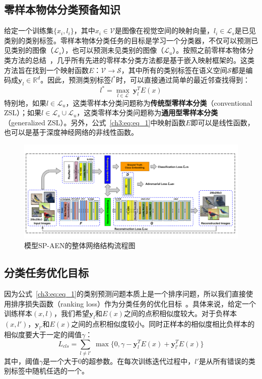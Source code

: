 \subsection{零样本物体分类预备知识}
给定一个训练集$\{x_i, l_i\}$，其中$x_i\in\mathcal{V}$是图像在视觉空间的映射向量，$l_i\in \mathcal{L}_s$是已见类别的类别标签。零样本物体分类任务的目标是学习一个分类器，不仅可以预测已见类别的图像（$\mathcal{L}_s$），也可以预测未见类别的图像（$\mathcal{L}_u$）。按照之前零样本物体分类方法的总结~\cite{xian2017zero,lei2015predicting}，几乎所有先进的零样本分类方法都是基于嵌入映射框架的。这类方法旨在找到一个映射函数$E$：$\mathcal{V}\rightarrow \mathcal{S}$，其中所有的类别标签在语义空间$\mathcal{S}$都是编码成$\bm{y}_l\in\mathbb{R}^d$。因此，预测类别标签$l^*$时，可以直接通过简单的最近邻查找得到：
\begin{equation}\label{ch3:eq:eq_1}
l^* = \max_{l\in\mathcal{L}}~\bm{y}^T_l E(x)
\end{equation}
特别地，如果$l\in\mathcal{L}_u$，这类零样本分类问题称为\textbf{传统型零样本分类}（conventional ZSL）；如果$l \in\mathcal{L}_s\cup \mathcal{L}_u$，这类零样本分类问题称为\textbf{通用型零样本分类}（generalized ZSL）。另外，公式~\eqref{ch3:eq:eq_1}中映射函数$E$即可以是线性函数，也可以是基于深度神经网络的非线性函数。


\begin{figure}[tbp]
    \centering
        \includegraphics[width=\linewidth]{chapter3/res/sp_aen.pdf}
    \caption{模型SP-AEN的整体网络结构流程图}
    \label{ch3:fig:sp_aen}
\end{figure}


\subsection{分类任务优化目标}
因为公式~\eqref{ch3:eq:eq_1}的类别预测问题本质上是一个排序问题，所以我们直接使用排序损失函数（ranking loss）作为分类任务的优化目标~\cite{frome2013devise,weston2010large}。具体来说，给定一个训练样本$(x, l)$，我们希望$\bm{y}_l$和$E(x)$之间的点积相似度较大。对于负样本$(x,l')$，$\bm{y}_{l'}$和$E(x)$之间的点积相似度较小。同时正样本的相似度相比负样本的相似度要大于一定的阈值$\gamma$：
\begin{equation} \label{ch3:eq:eq_2}
L_{cls} = \sum\limits_{l\neq l'}~\max\{0, \gamma - \bm{y}_l^T E(x) + \bm{y}^T_{l'} E(x)\}
\end{equation}
其中，阈值$\gamma$是一个大于0的超参数。在每次训练迭代过程中，$l'$是从所有错误的类别标签中随机任选的一个。

